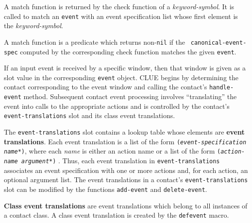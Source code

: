 \documentclass[twoside]{book}
\begin{document}
\begin{sloppy}
\begin{flushright}
{}\end{flushright}

\begin{flushright} \parbox[t]{6.125in}{
A match function is returned by the check function of a
{\em keyword-symbol}. It
is called to match an {\tt event} with an event specification list whose
first element is the {\em keyword-symbol}.

A match function is a predicate which returns non-{\tt nil} if the {\tt
canonical-event-spec} computed by the corresponding check function matches the
given {\tt event}.


}\end{flushright}



If an input event is received by a specific window, then that window is given as
a slot value in the corresponding {\tt event} object. CLUE begins by determining
the contact corresponding to the event window and  calling the contact's
{\tt handle-event} method. 
Subsequent contact event processing
involves ``translating'' the event into calls to the appropriate
actions and is controlled by the contact's {\tt
event-translations} slot and its class event translations.

The {\tt event-translations} slot contains a lookup
table\footnotemark{}
whose elements
are {\bf event translations}. Each event
translation is a list of the form {\tt ({\em event-specification} {\em name*})},
where each {\em name} is either an action name or a list of
the form {\tt ({\em action-name argument*})} . 
Thus, each event translation in {\tt event-translations} associates  an event
specification with one or more actions and, 
for each action, an optional argument
list. The event translations in a contact's {\tt event-translations} slot can
be modified by the functions {\tt add-event} and {\tt delete-event}.


{\bf Class event translations} are event translations which
belong to all instances of a contact class. A class event translation is created by
the {\tt defevent} macro.


\end{sloppy}
\end{document}
